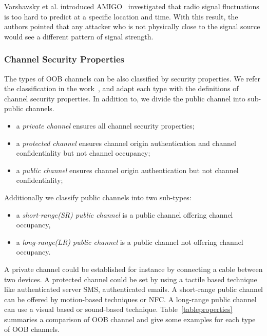 Varshavsky et al. introduced AMIGO~\cite{Scannell07amigo:proximity-based} investigated that radio signal fluctuations is too hard to predict at a specific location and time. With this result, the authors pointed that any attacker who is not physically close to the signal source would see a different pattern of signal strength.

\subsubsection{Channel Security Properties}

The types of OOB channels can be also classified by security properties. We refer the classification in the work~\cite{6687314}, and adapt each type with the definitions of channel security properties. In addition to, we divide the public channel into sub-public channels. 
\begin{itemize}
 \item a \textit{private channel} ensures all channel security properties;
 \item a \textit{protected channel} ensures channel origin authentication and channel confidentiality but not channel occupancy;
 \item a \textit{public channel} ensures channel origin authentication but not channel confidentiality;
\end{itemize}

Additionally we classify public channels into two sub-types: 
\begin{itemize}
 \item a \textit{short-range(SR) public channel} is a public channel offering channel occupancy,
 \item a \textit{long-range(LR) public channel} is a public channel not offering channel occupancy.
\end{itemize}

A private channel could be established for instance by connecting a cable between two devices. A protected channel could be set by using a tactile based technique like authenticated server SMS, authenticated emails. A short-range public channel can be offered by motion-based techniques or NFC. A long-range public channel can use a visual based or sound-based technique. Table~\ref{tableproperties} summaries a comparison of OOB channel and give some examples for each type of OOB channels.


